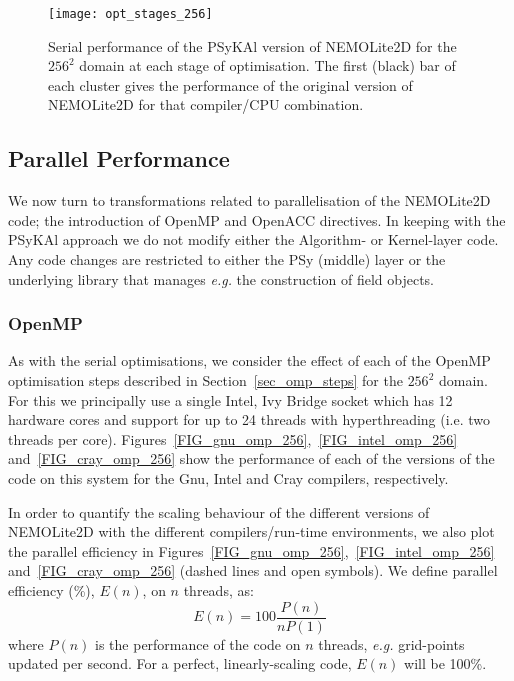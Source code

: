 \documentclass[gmd, manuscript]{copernicus}
\begin{document}
\begin{figure}[!t]
\centering
\texttt{[image: opt\_stages\_256]}
\caption{Serial performance of the {PS}y{KA}l version of NEMOLite2D for the
  $256^{2}$ domain at each stage of optimisation. The first (black)
  bar of each cluster gives the performance of the original version of
  NEMOLite2D for that compiler/CPU combination.}
\label{FIG_opt_stages_256}
\end{figure}

\subsection{Parallel Performance}

We now turn to transformations related to parallelisation of the
NEMOLite2D code; the introduction of OpenMP and OpenACC directives. In
keeping with the {PS}y{KA}l approach we do not modify either the
Algorithm- or Kernel-layer code.  Any code changes are restricted to
either the PSy (middle) layer or the underlying library that manages
\textit{e.g.} the construction of field objects.

\subsubsection{OpenMP}

As with the serial optimisations, we consider the effect of each of
the OpenMP optimisation steps described in Section~\ref{sec_omp_steps}
for the $256^2$ domain. For this we principally use a single Intel,
Ivy Bridge socket which has 12 hardware cores and support for up to 24
threads with hyperthreading (i.e. two threads per core).
Figures~\ref{FIG_gnu_omp_256},~\ref{FIG_intel_omp_256}
and~\ref{FIG_cray_omp_256} show the performance of each of the
versions of the code on this system for the Gnu, Intel and Cray
compilers, respectively.

In order to quantify the scaling behaviour of the different versions
of NEMOLite2D with the different compilers/run-time environments, we
also plot the parallel efficiency in
Figures~\ref{FIG_gnu_omp_256},~\ref{FIG_intel_omp_256}
and~\ref{FIG_cray_omp_256} (dashed lines and open symbols). We define
parallel efficiency (\%), $E(n)$, on $n$ threads, as:
\[
E(n) = 100  \frac{P(n)}{ n P(1)}
\]
where $P(n)$ is the performance of the code on $n$ threads,
\textit{e.g.} grid-points updated per second. For a
perfect, linearly-scaling code, $E(n)$ will be 100\%.
\end{document}
